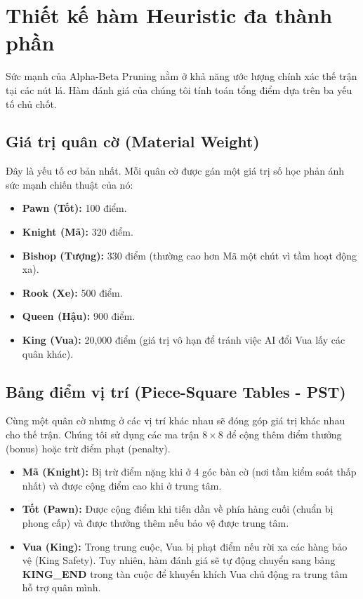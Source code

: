 \section{Thiết kế hàm Heuristic đa thành phần}

Sức mạnh của Alpha-Beta Pruning nằm ở khả năng ước lượng chính xác thế trận tại các nút lá. Hàm đánh giá của chúng tôi tính toán tổng điểm dựa trên ba yếu tố chủ chốt.

\subsection{Giá trị quân cờ (Material Weight)}
Đây là yếu tố cơ bản nhất. Mỗi quân cờ được gán một giá trị số học phản ánh sức mạnh chiến thuật của nó:
\begin{itemize}
    \item \textbf{Pawn (Tốt):} 100 điểm.
    \item \textbf{Knight (Mã):} 320 điểm.
    \item \textbf{Bishop (Tượng):} 330 điểm (thường cao hơn Mã một chút vì tầm hoạt động xa).
    \item \textbf{Rook (Xe):} 500 điểm.
    \item \textbf{Queen (Hậu):} 900 điểm.
    \item \textbf{King (Vua):} 20,000 điểm (giá trị vô hạn để tránh việc AI đổi Vua lấy các quân khác).
\end{itemize}

\subsection{Bảng điểm vị trí (Piece-Square Tables - PST)}
Cùng một quân cờ nhưng ở các vị trí khác nhau sẽ đóng góp giá trị khác nhau cho thế trận. Chúng tôi sử dụng các ma trận $8 \times 8$ để cộng thêm điểm thưởng (bonus) hoặc trừ điểm phạt (penalty).
\begin{itemize}
    \item \textbf{Mã (Knight):} Bị trừ điểm nặng khi ở 4 góc bàn cờ (nơi tầm kiểm soát thấp nhất) và được cộng điểm cao khi ở trung tâm.
    \item \textbf{Tốt (Pawn):} Được cộng điểm khi tiến dần về phía hàng cuối (chuẩn bị phong cấp) và được thưởng thêm nếu bảo vệ được trung tâm.
    \item \textbf{Vua (King):} Trong trung cuộc, Vua bị phạt điểm nếu rời xa các hàng bảo vệ (King Safety). Tuy nhiên, hàm đánh giá sẽ tự động chuyển sang bảng \textbf{KING\_END} trong tàn cuộc để khuyến khích Vua chủ động ra trung tâm hỗ trợ quân mình.
\end{itemize}

